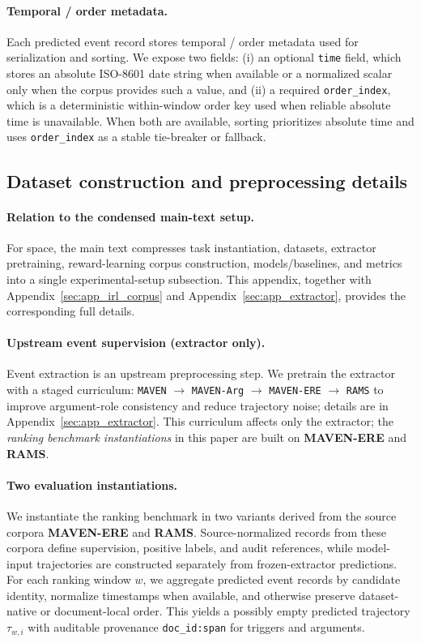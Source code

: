 \documentclass{article}
\begin{document}
\paragraph{Temporal / order metadata.}
Each predicted event record stores temporal / order metadata used for serialization and sorting.
We expose two fields:
(i) an optional \texttt{time} field, which stores an absolute ISO-8601 date string when available or a normalized scalar only when the corpus provides such a value, and
(ii) a required \texttt{order\_index}, which is a deterministic within-window order key used when reliable absolute time is unavailable.
When both are available, sorting prioritizes absolute time and uses \texttt{order\_index} as a stable tie-breaker or fallback.

\subsection{Dataset construction and preprocessing details}
\label{sec:app_moved_data_details}

\paragraph{Relation to the condensed main-text setup.}
For space, the main text compresses task instantiation, datasets, extractor pretraining, reward-learning corpus construction, models/baselines, and metrics into a single experimental-setup subsection. This appendix, together with Appendix~\ref{sec:app_irl_corpus} and Appendix~\ref{sec:app_extractor}, provides the corresponding full details.

\paragraph{Upstream event supervision (extractor only).}
Event extraction is an upstream preprocessing step.
We pretrain the extractor with a staged curriculum:
\texttt{MAVEN} $\rightarrow$ \texttt{MAVEN-Arg} $\rightarrow$ \texttt{MAVEN-ERE} $\rightarrow$ \texttt{RAMS}
to improve argument-role consistency and reduce trajectory noise; details are in Appendix~\ref{sec:app_extractor}.
This curriculum affects only the extractor; the \emph{ranking benchmark instantiations} in this paper are built on \textbf{MAVEN-ERE} and \textbf{RAMS}.

\paragraph{Two evaluation instantiations.}
We instantiate the ranking benchmark in two variants derived from the source corpora \textbf{MAVEN-ERE} and \textbf{RAMS}.
Source-normalized records from these corpora define supervision, positive labels, and audit references, while model-input trajectories are constructed separately from frozen-extractor predictions.
For each ranking window $w$, we aggregate predicted event records by candidate identity, normalize timestamps when available, and otherwise preserve dataset-native or document-local order.
This yields a possibly empty predicted trajectory $\tau_{w,i}$ with auditable provenance \texttt{doc\_id:span} for triggers and arguments.
\end{document}
